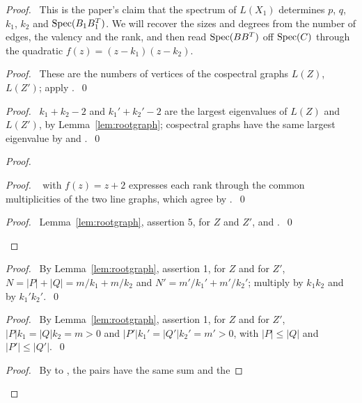 \begin{proof}
 \pfsketch\ This is the paper's claim that the spectrum of $L(X_1)$ determines $p$, $q$, $k_1$,
 $k_2$ and $\mathop{\mathrm{Spec}}\nolimits(B_1B_1^T)$. We will recover the sizes and degrees from the number of
 edges, the valency and the rank, and then read $\mathop{\mathrm{Spec}}\nolimits(BB^T)$ off $\mathop{\mathrm{Spec}}\nolimits(C)$ through the
 quadratic $f(z)=(z-k_1)(z-k_2)$.
 \begin{proof}\pf\ These are the numbers of vertices of the cospectral graphs $L(Z)$, $L(Z')$;
  apply .~\qed\end{proof}
 \begin{proof}\pf\ $k_1+k_2-2$ and $k_1'+k_2'-2$ are the largest eigenvalues of $L(Z)$ and
  $L(Z')$, by Lemma~\ref{lem:rootgraph}; cospectral graphs have the same largest eigenvalue by
   and .~\qed\end{proof}
 \begin{proof}
  \begin{proof}\pf\  with $f(z)=z+2$ expresses each rank through the common
   multiplicities of the two line graphs, which agree by .~\qed\end{proof}
  \qedstep
  \begin{proof}\pf\ Lemma~\ref{lem:rootgraph}, assertion 5, for $Z$ and $Z'$, and
   .~\qed\end{proof}
 \end{proof}
 \begin{proof}\pf\ By Lemma~\ref{lem:rootgraph}, assertion 1, for $Z$ and for $Z'$,
  $N=|P|+|Q|=m/k_1+m/k_2$ and $N'=m'/k_1'+m'/k_2'$; multiply by $k_1k_2$ and by
  $k_1'k_2'$.~\qed\end{proof}
 \begin{proof}\pf\ By Lemma~\ref{lem:rootgraph}, assertion 1, for $Z$ and for $Z'$,
  $|P|k_1=|Q|k_2=m>0$ and $|P'|k_1'=|Q'|k_2'=m'>0$, with $|P|\le|Q|$ and
  $|P'|\le|Q'|$.~\qed\end{proof}
 \begin{proof}\pf\ By  to , the pairs have the same sum and the

\end{proof}
\end{proof}
